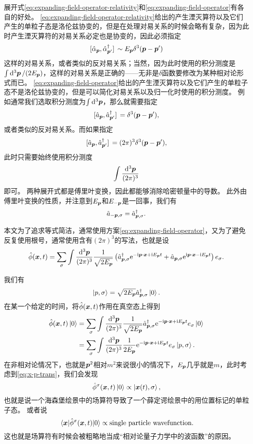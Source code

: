 \documentclass[hyperref, UTF8, a4paper]{ctexart}
\newcommand*{\ii}{\mathrm{i}}
\newcommand*{\ee}{\mathrm{e}}
\begin{document}
展开式\eqref{eq:expanding-field-operator-relativity}和\eqref{eq:expanding-field-operator}有各自的好处。
\eqref{eq:expanding-field-operator-relativity}给出的产生湮灭算符以及它们产生的单粒子态是洛伦兹协变的，但是在处理对易关系的时候会略有复杂，因为此时产生湮灭算符的对易关系必定也是协变的，因此必须指定
\[
    \comm*{\hat{\alpha}_{\vb*{p}}}{\hat{\alpha}^\dagger_{\vb*{p}'}} \sim E_{\vb*{p}} \delta^3 (\vb*{p} - \vb*{p}')
\]
这样的对易关系，或者类似的反对易关系；当然，因为此时使用的积分测度是$\int \dd[3]{\vb*{p}} / (2 E_{\vb*{p}})$，这样的对易关系是正确的——无非是$\delta$函数要修改为某种相对论形式而已。
\eqref{eq:expanding-field-operator}给出的产生湮灭算符以及它们产生的单粒子态不是洛伦兹协变的，但是可以简化对易关系以及归一化时使用的积分测度。
例如通常我们选取积分测度为$\int \dd[3]{\vb*{p}}$，那么就需要指定
\[
    \comm*{\hat{a}_{\vb*{p}}}{\hat{a}^\dagger_{\vb*{p}'}} = \delta^3 (\vb*{p} - \vb*{p}'),
\]
或者类似的反对易关系。而如果指定
\[
    \comm*{\hat{a}_{\vb*{p}}}{\hat{a}^\dagger_{\vb*{p}'}} = (2\pi)^3 \delta^3 (\vb*{p} - \vb*{p}'),
\]
此时只需要始终使用积分测度
\[
    \int \frac{\dd[3]{\vb*{p}}}{(2\pi)^3}
\]
即可。
两种展开式都是傅里叶变换，因此都能够消除哈密顿量中的导数。
此外由傅里叶变换的性质，并注意到$E_{\vb*{p}}$和$E_{-\vb*{p}}$是一回事，我们有
\begin{equation}
    \hat{a}_{-\vb*{p}, \sigma} = \hat{a}_{\vb*{p}, \sigma}^\dagger.
\end{equation}

本文为了追求等式简洁，通常使用方案\eqref{eq:expanding-field-operator}，又为了避免反复使用根号，通常使用含有$(2\pi)^3$的写法，也就是设
\begin{equation}
    \hat{\phi}(\vb*{x}, t) = \sum_\sigma \int \frac{\dd[3]{\vb*{p}}}{(2\pi)^3} \frac{1}{\sqrt{2 E_{\vb*{p}}}} \left( \hat{a}^\dagger_{\vb*{p}, \sigma} \ee^{- \ii \vb*{p} \cdot \vb*{x} + \ii E_{\vb*{p}} t} + \hat{a}_{\vb*{p}, \sigma} \ee^{\ii \vb*{p} \cdot \vb*{x} - \ii E_{\vb*{p}} t} \right) e_\sigma. 
    \label{eq:field-operator-fourier}
\end{equation}

我们有
\[
    \ket{p, \sigma} = \sqrt{2 E_{\vb*{p}}} \hat{a}^\dagger_{\vb*{p}, \sigma} \ket{0}.
\]
在某一个给定的时间，将$\hat{\phi}(\vb*{x}, t)$作用在真空态上得到
\[
    \begin{aligned}
        \hat{\phi}(\vb*{x}, t) \ket{0} &= \sum_\sigma \int \frac{\dd[3]{\vb*{p}}}{(2\pi)^3} \frac{1}{\sqrt{2 E_{\vb*{p}}}} \hat{a}^\dagger_{\vb*{p}, \sigma} \ee^{- \ii \vb*{p} \cdot \vb*{x} + \ii E_{\vb*{p}} t} e_{\sigma} \ket{0} \\
        &= \sum_\sigma \int \frac{\dd[3]{\vb*{p}}}{(2\pi)^3} \frac{1}{2 E_{\vb*{p}}} \ee^{- \ii \vb*{p} \cdot \vb*{x} + \ii E_{\vb*{p}} t} e_{\sigma} \ket{p, \sigma}.
    \end{aligned}
\]
在非相对论情况下，也就是$\vb*{p}^2$相对$m^2$来说很小的情况下，$E_{\vb*{p}}$几乎就是$m$，此时考虑到\eqref{eq:x-p-trans}，我们会发现
\[
    \hat{\phi}^\sigma (\vb*{x}, t) \ket{0} \propto \ket{\vb*{x}(t), \sigma},
\]
也就是说一个海森堡绘景中的场算符导致了一个薛定谔绘景中的用位置标记的单粒子态。
或者说
\[
    \mel{\vb*{x}}{\hat{\phi}^\sigma (\vb*{x}, t)}{0} \propto \text{single particle wavefunction}.
\]
这也就是场算符有时候会被粗略地当成“相对论量子力学中的波函数”的原因。
\end{document}

